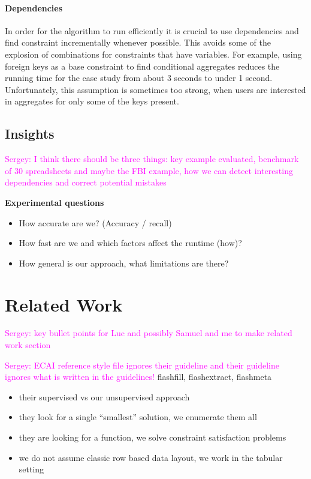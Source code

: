 \documentclass{ecai}
\newcommand{\sergey}[1]{\textcolor{magenta}{{\sc Sergey:} #1}\xspace}
\begin{document}
\paragraph{Dependencies}
In order for the algorithm to run efficiently it is crucial to use dependencies and find constraint incrementally whenever possible.
This avoids some of the explosion of combinations for constraints that have variables.
For example, using foreign keys as a base constraint to find conditional aggregates reduces the running time for the case study from about 3 seconds to under 1 second.
Unfortunately, this assumption is sometimes too strong, when users are interested in aggregates for only some of the keys present.

\subsection{Insights}


\sergey{I think there should be three things: key example evaluated, benchmark of 30 spreadsheets and maybe the FBI example, how we can detect interesting dependencies and correct potential mistakes}


{\bfseries 
  Experimental questions
}

\begin{itemize}
  \item  How accurate are we? (Accuracy / recall)
  \item  How fast are we and which factors affect the runtime (how)?
  \item  How general is our approach, what limitations are there?
\end{itemize}


\section{Related Work}
\sergey{key bullet points for Luc and possibly Samuel and me to make related work section}

\sergey{ECAI reference style file ignores their guideline and their guideline ignores what is written in the guidelines!}
flashfill, flashextract, flashmeta \cite{flashfill,flashextract,flashmeta}
\begin{itemize}
  \item their supervised vs our unsupervised approach
  \item they look for a single ``smallest'' solution, we enumerate them all
  \item they are looking for a function, we solve constraint satisfaction problems
  \item we do not assume classic row based data layout, we work in the tabular setting
\end{itemize}
\end{document}
